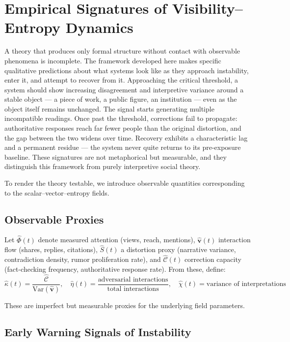 \documentclass[12pt,a4paper]{article}
\begin{document}
\section{Empirical Signatures of Visibility--Entropy Dynamics}

A theory that produces only formal structure without contact with observable phenomena is incomplete. The framework developed here makes specific qualitative predictions about what systems look like as they approach instability, enter it, and attempt to recover from it. Approaching the critical threshold, a system should show increasing disagreement and interpretive variance around a stable object — a piece of work, a public figure, an institution — even as the object itself remains unchanged. The signal starts generating multiple incompatible readings. Once past the threshold, corrections fail to propagate: authoritative responses reach far fewer people than the original distortion, and the gap between the two widens over time. Recovery exhibits a characteristic lag and a permanent residue — the system never quite returns to its pre-exposure baseline. These signatures are not metaphorical but measurable, and they distinguish this framework from purely interpretive social theory.

To render the theory testable, we introduce observable quantities corresponding to the scalar--vector--entropy fields.

\subsection{Observable Proxies}

Let $\hat{\Phi}(t)$ denote measured attention (views, reach, mentions), $\hat{\mathbf{v}}(t)$ interaction flow (shares, replies, citations), $\hat{S}(t)$ a distortion proxy (narrative variance, contradiction density, rumor proliferation rate), and $\hat{\mathcal{C}}(t)$ correction capacity (fact-checking frequency, authoritative response rate). From these, define:
\[
\hat{\kappa}(t) = \frac{\hat{\mathcal{C}}}{\mathrm{Var}(\hat{\mathbf{v}})},
\quad
\hat{\eta}(t) = \frac{\text{adversarial interactions}}{\text{total interactions}},
\quad
\hat{\chi}(t) = \text{variance of interpretations}
\]

These are imperfect but measurable proxies for the underlying field parameters.

\subsection{Early Warning Signals of Instability}
\end{document}
